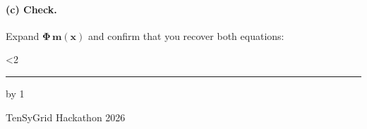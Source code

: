 \documentclass[10pt,a4paper]{article}
\newcommand{\answerlines}[1]{%
  \par\vspace{2pt}%
  \anslinecount=0\relax
  \loop
    \ifnum\anslinecount<#1
      \noindent\rule{\textwidth}{0.4pt}\par\vspace{24pt}%
      \advance\anslinecount by 1\relax
  \repeat
  \par\vspace{2pt}}
\newif\ifanswerkey
\begin{document}
\paragraph{(c) Check.} Expand $\boldsymbol{\Phi}\,\mathbf m(\mathbf x)$ and confirm that you
recover both equations:
\answerlines{2}

\vfill
{\par TenSyGrid Hackathon 2026}

\ifanswerkey
\newpage
\section*{Mentor answer key --- do not distribute}
\addcontentsline{toc}{section}{Mentor answer key}
With the column order used above, the factor vector is
\[
 \mathbf m(\mathbf x)=(\dot x_1y_1,\;z_1x_1,\;u_1x_1,\;u_1z_1x_1,\;x_1,\;\dot x_1,\;y_1)^\mathsf T.
\]
Therefore
\[
 \boxed{\quad
 \begin{aligned}
  0 &= 3\dot x_1 y_1 + 2z_1 x_1 - u_1 x_1 - u_1 z_1 x_1 + 2x_1,\\
  0 &= \dot x_1 - y_1.
 \end{aligned}\quad}
\]
At the equilibrium $\mathbf x=(2,2,3,2,5)^\mathsf T$,
$\mathbf m=(4,10,6,30,2,2,2)^\mathsf T$ and
$\boxed{\;f_1=0,\quad f_2=0\;}$: the point satisfies $\dot x_1=y_1=2$ and
$3\dot x_1y_1+x_1(2z_1-u_1-u_1z_1+2)=12-12=0$.
Common pitfalls: confusing $\dot x_1$ with $x_1$, forgetting that an entry
$S_{ij}=0$ contributes a factor 1, putting a minus sign in $\mathbf{S}$ instead of
$\boldsymbol{\Phi}$, and taking coefficients from the wrong row of $\boldsymbol{\Phi}$.

\section*{Inverse exercise --- solution}
With the prescribed column order $(1,x_1x_2,u_1,x_2)$,
\[
 \mathbf{S}=\begin{pmatrix}
  0&1&0&0\\
  0&1&0&1\\
  0&0&1&0
 \end{pmatrix},\qquad
 \boldsymbol{\Phi}=\begin{pmatrix}
  2& 3&-4&0\\
 -1&-1& 0&5
 \end{pmatrix}.
\]
Indeed,
\[
 \boldsymbol{\Phi}\,\mathbf m(\mathbf x)=
 \begin{pmatrix}
  2+3x_1x_2-4u_1\\
  -1-x_1x_2+5x_2
 \end{pmatrix}.
\]
Fixing the order of $\mathbf m$ makes the answer unique; the minus signs are
coefficients in $\boldsymbol{\Phi}$, not part of the monomials.
\fi
\end{document}
